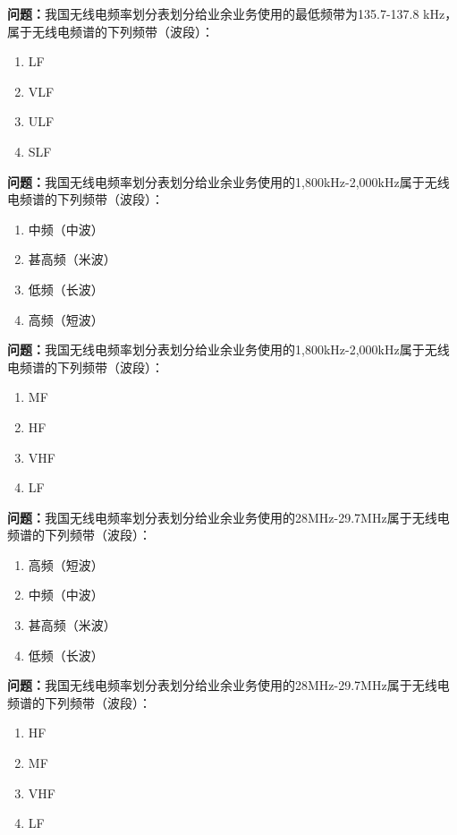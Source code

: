 \bigskip


\noindent\textbf{问题：}我国无线电频率划分表划分给业余业务使用的最低频带为135.7-137.8 kHz，属于无线电频谱的下列频带（波段）：
\begin{enumerate}[label=\Alph*), leftmargin=3em]
\item LF
\item VLF
\item ULF
\item SLF
\end{enumerate}

\bigskip


\noindent\textbf{问题：}我国无线电频率划分表划分给业余业务使用的1,800kHz-2,000kHz属于无线电频谱的下列频带（波段）：
\begin{enumerate}[label=\Alph*), leftmargin=3em]
\item 中频（中波）
\item 甚高频（米波）
\item 低频（长波）
\item 高频（短波）
\end{enumerate}

\bigskip


\noindent\textbf{问题：}我国无线电频率划分表划分给业余业务使用的1,800kHz-2,000kHz属于无线电频谱的下列频带（波段）：
\begin{enumerate}[label=\Alph*), leftmargin=3em]
\item MF
\item HF
\item VHF
\item LF
\end{enumerate}

\bigskip


\noindent\textbf{问题：}我国无线电频率划分表划分给业余业务使用的28MHz-29.7MHz属于无线电频谱的下列频带（波段）：
\begin{enumerate}[label=\Alph*), leftmargin=3em]
\item 高频（短波）
\item 中频（中波）
\item 甚高频（米波）
\item 低频（长波）
\end{enumerate}

\bigskip


\noindent\textbf{问题：}我国无线电频率划分表划分给业余业务使用的28MHz-29.7MHz属于无线电频谱的下列频带（波段）：
\begin{enumerate}[label=\Alph*), leftmargin=3em]
\item HF
\item MF
\item VHF
\item LF
\end{enumerate}

